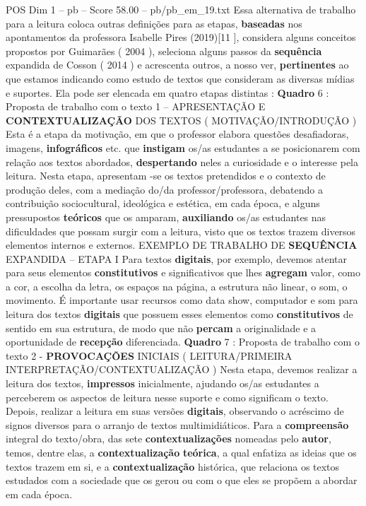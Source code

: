 \begin{textsample}{POS Dim 1 – pb – Score 58.00 – pb/pb\_em\_19.txt}
Essa alternativa de trabalho para a leitura coloca outras definições para as etapas, \textbf{baseadas} nos apontamentos da professora Isabelle Pires (2019)[11 ], considera alguns conceitos propostos por Guimarães ( 2004 ), seleciona alguns passos da \textbf{sequência} expandida de Cosson ( 2014 ) e acrescenta outros, a nosso ver, \textbf{pertinentes} ao que estamos indicando como estudo de textos que consideram as diversas mídias e suportes.
Ela pode ser elencada em quatro etapas distintas : \textbf{Quadro} 6 : Proposta de trabalho com o texto 1 – APRESENTAÇÃO E \textbf{CONTEXTUALIZAÇÃO} DOS TEXTOS ( MOTIVAÇÃO/INTRODUÇÃO ) Esta é a etapa da motivação, em que o professor elabora questões desafiadoras, imagens, \textbf{infográficos} etc. que \textbf{instigam} os/as estudantes a se posicionarem com relação aos textos abordados, \textbf{despertando} neles a curiosidade e o interesse pela leitura.
Nesta etapa, apresentam -se os textos pretendidos e o contexto de produção deles, com a mediação do/da professor/professora, debatendo a contribuição sociocultural, ideológica e estética, em cada época, e alguns pressupostos \textbf{teóricos} que os amparam, \textbf{auxiliando} os/as estudantes nas dificuldades que possam surgir com a leitura, visto que os textos trazem diversos elementos internos e externos.
EXEMPLO DE TRABALHO DE \textbf{SEQUÊNCIA} EXPANDIDA – ETAPA I Para textos \textbf{digitais}, por exemplo, devemos atentar para seus elementos \textbf{constitutivos} e significativos que lhes \textbf{agregam} valor, como a cor, a escolha da letra, os espaços na página, a estrutura não linear, o som, o movimento.
É importante usar recursos como data show, computador e som para leitura dos textos \textbf{digitais} que possuem esses elementos como \textbf{constitutivos} de sentido em sua estrutura, de modo que não \textbf{percam} a originalidade e a oportunidade de \textbf{recepção} diferenciada. \textbf{Quadro} 7 : Proposta de trabalho com o texto 2 - \textbf{PROVOCAÇÕES} INICIAIS ( LEITURA/PRIMEIRA INTERPRETAÇÃO/CONTEXTUALIZAÇÃO ) Nesta etapa, devemos realizar a leitura dos textos, \textbf{impressos} inicialmente, ajudando os/as estudantes a perceberem os aspectos de leitura nesse suporte e como significam o texto.
Depois, realizar a leitura em suas versões \textbf{digitais}, observando o acréscimo de signos diversos para o arranjo de textos multimidiáticos.
Para a \textbf{compreensão} integral do texto/obra, das sete \textbf{contextualizações} nomeadas pelo \textbf{autor}, temos, dentre elas, a \textbf{contextualização} \textbf{teórica}, a qual enfatiza as ideias que os textos trazem em si, e a \textbf{contextualização} histórica, que relaciona os textos estudados com a sociedade que os gerou ou com o que eles se propõem a abordar em cada época.

\end{textsample}
